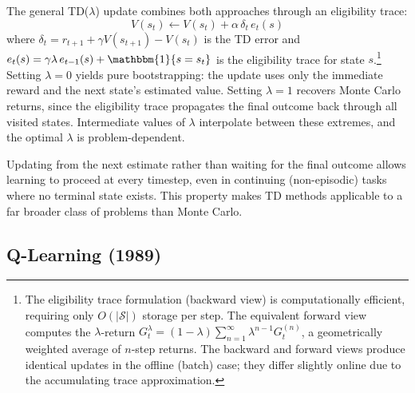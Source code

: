 The general TD($\lambda$) update combines both approaches through an eligibility trace:
\begin{equation}
V(s_t) \leftarrow V(s_t) + \alpha \, \delta_t \, e_t(s)
\end{equation}
where $\delta_t = r_{t+1} + \gamma V(s_{t+1}) - V(s_t)$ is the TD error and $e_t(s) = \gamma \lambda \, e_{t-1}(s) + \mathbbm{1}\{s = s_t\}$ is the eligibility trace for state $s$.\footnote{The eligibility trace formulation (backward view) is computationally efficient, requiring only $O(|\mathcal{S}|)$ storage per step. The equivalent forward view computes the $\lambda$-return $G_t^\lambda = (1-\lambda) \sum_{n=1}^{\infty} \lambda^{n-1} G_t^{(n)}$, a geometrically weighted average of $n$-step returns. The backward and forward views produce identical updates in the offline (batch) case; they differ slightly online due to the accumulating trace approximation.} Setting $\lambda = 0$ yields pure bootstrapping: the update uses only the immediate reward and the next state's estimated value. Setting $\lambda = 1$ recovers Monte Carlo returns, since the eligibility trace propagates the final outcome back through all visited states. Intermediate values of $\lambda$ interpolate between these extremes, and the optimal $\lambda$ is problem-dependent.

Updating from the next estimate rather than waiting for the final outcome allows learning to proceed at every timestep, even in continuing (non-episodic) tasks where no terminal state exists. This property makes TD methods applicable to a far broader class of problems than Monte Carlo.

\subsection{Q-Learning (1989)}

